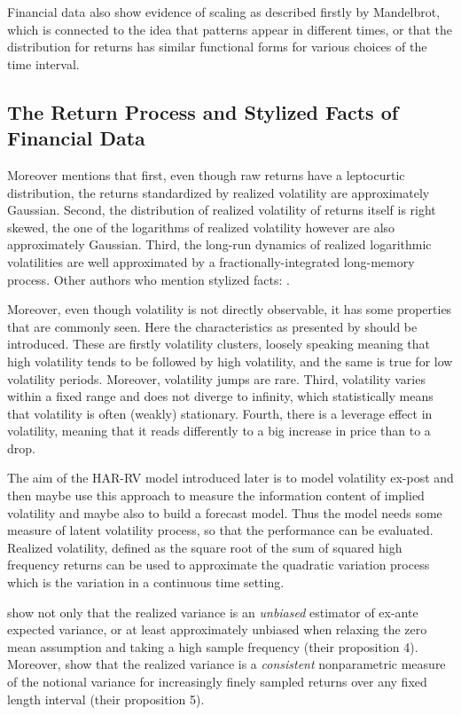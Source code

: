  Financial data also show evidence of scaling as described firstly by Mandelbrot, which is connected to the idea that patterns appear in different times, or that the distribution for returns has similar functional forms for various choices of the time interval. \\
 
 \subsection{The Return Process and Stylized Facts of Financial Data}\label{sec:21ReturnProcess}
 Moreover \citeauthor{andersen2001} mentions that first, even though raw returns have a leptocurtic distribution, the returns standardized by realized volatility are approximately Gaussian. Second, the distribution of realized volatility of returns itself is right skewed, the one of the logarithms of realized volatility however are also approximately Gaussian. Third, the long-run dynamics of realized logarithmic volatilities are well approximated by a fractionally-integrated long-memory process. Other authors who mention stylized facts: \parencite{jiang2003}.

Moreover, even though volatility is not directly observable, it has some properties that are commonly seen. Here the characteristics as presented by \citeauthor{tsay2005} should be introduced. These are firstly volatility clusters, loosely speaking meaning that high volatility tends to be followed by high volatility, and the same is true for low volatility periods. Moreover, volatility jumps are rare. Third, volatility varies within a fixed range and does not diverge to infinity, which statistically means that volatility is often (weakly) stationary. Fourth, there is a leverage effect in volatility, meaning that it reads differently to a big increase in price than to a drop. 

The aim of the HAR-RV model introduced later is to model volatility ex-post and then maybe use this approach to measure the information content of implied volatility and maybe also to build a forecast model. Thus the model needs some measure of latent volatility process, so that the performance can be evaluated. \\

Realized volatility, defined as the square root of the sum of squared high frequency returns can be used to approximate the quadratic variation process which is the variation in a continuous time setting.

\citeauthor{andersen2001} show not only that the realized variance is an \emph{unbiased} estimator of ex-ante expected variance, or at least approximately unbiased when relaxing the zero mean assumption and taking a high sample frequency (their proposition 4). Moreover, \citeauthor{andersen2001} show that the realized variance is a \emph{consistent} nonparametric measure of the notional variance for increasingly finely sampled returns over any fixed length interval (their proposition 5).\\


